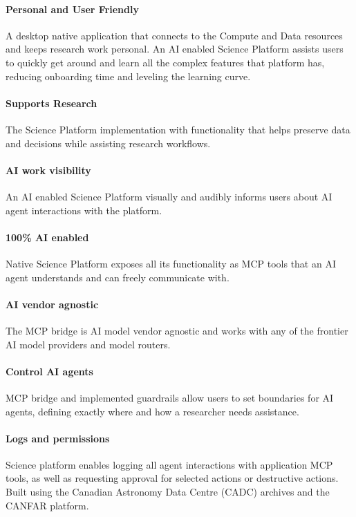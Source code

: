 \documentclass[11pt,twoside]{article}
\begin{document}
\paragraph{Personal and User Friendly}
A desktop native application that connects to the Compute and Data resources and keeps research work personal. An AI enabled Science Platform assists users to quickly get around and learn all the complex features that platform has, reducing onboarding time and leveling the learning curve.


\paragraph{Supports Research}
The Science Platform implementation with functionality that helps preserve data and decisions while assisting research workflows.

\paragraph{AI work visibility}
An AI enabled Science Platform visually and audibly informs users about AI agent interactions with the platform.

\paragraph{100\% AI enabled}
Native Science Platform exposes all its functionality as MCP tools that an AI agent understands and can freely communicate with.

\paragraph{AI vendor agnostic}
The MCP bridge is AI model vendor agnostic and works with any of the frontier AI model providers and model routers.

\paragraph{Control AI agents}
MCP bridge and implemented guardrails allow users to set boundaries for AI agents, defining exactly where and how a researcher needs assistance.

\paragraph{Logs and permissions}
Science platform enables logging all agent interactions with application MCP tools, as well as requesting approval for selected actions or destructive actions.
\\
\acknowledgements Built using the Canadian Astronomy Data Centre (CADC) archives and the CANFAR platform.
\end{document}
